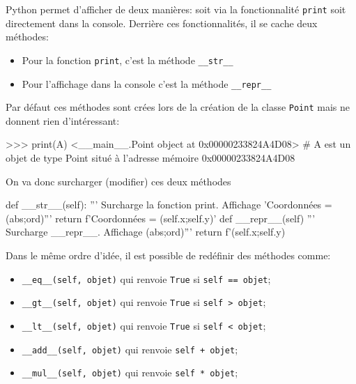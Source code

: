 \begin{easybox}[Affichage]{}
    Python permet d'afficher de deux manières: soit via la fonctionnalité \verb+print+ soit directement dans la console. Derrière ces fonctionnalités, il se cache deux méthodes:
    \begin{itemize}
        \item Pour la fonction \verb+print+, c'est la méthode \verb+__str__+
        \item Pour l'affichage dans la console c'est la méthode \verb+__repr__+
    \end{itemize}

    Par défaut ces méthodes sont crées lors de la création de la classe \verb+Point+ mais ne donnent rien d'intéressant:
        \begin{CodePythontexAlt}[Largeur=1\linewidth,Centre,Lignes=true,PremLigne=1]{}
        >>> print(A)
        <__main__.Point object at 0x00000233824A4D08>   
        # A est un objet de type Point situé à l'adresse mémoire 0x00000233824A4D08                 
    \end{CodePythontexAlt}

        On va donc surcharger (modifier) ces deux méthodes

        \begin{CodePythontexAlt}[Largeur=1\linewidth,Centre,Lignes=true,PremLigne=1]{}
            def __str__(self):
                ''' Surcharge la fonction print. Affichage 'Coordonnées = (abs;ord)'''
                return f'Coordonnées = ({self.x};{self.y})'
            def __repr__(self)
                ''' Surcharge __repr__. Affichage (abs;ord)'''
                return f'({self.x};{self.y})
        \end{CodePythontexAlt}
        


\end{easybox}

\begin{definition}{}
    Dans le même ordre d'idée, il est possible de redéfinir des méthodes comme:
    \begin{itemize}
        \item \verb+__eq__(self, objet)+ qui renvoie \verb+True+ si \verb+self == objet+;
        \item \verb+__gt__(self, objet)+ qui renvoie \verb+True+ si \verb+self > objet+;
        \item \verb+__lt__(self, objet)+ qui renvoie \verb+True+ si \verb+self < objet+;
        \item \verb+__add__(self, objet)+ qui renvoie \verb-self + objet-;
        \item \verb+__mul__(self, objet)+ qui renvoie \verb+self * objet+;
    \end{itemize}
\end{definition}

